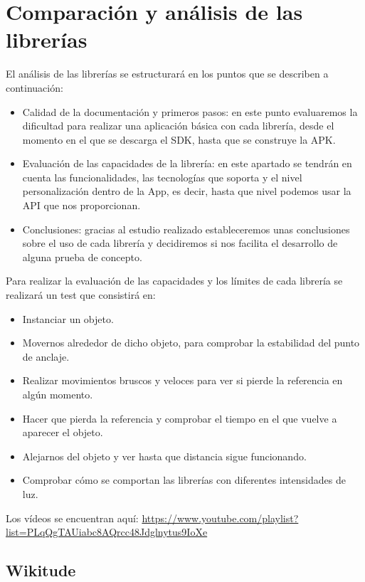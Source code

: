 
\chapter{Comparación y análisis de las librerías}

El análisis de las librerías se estructurará en los puntos que se describen a continuación:
\begin{itemize}
\item Calidad de la documentación y primeros pasos: en este punto evaluaremos la dificultad para realizar una aplicación básica con cada librería, desde el momento en el que se descarga el SDK, hasta que se construye la APK. 
\item Evaluación de las capacidades de la librería: en este apartado se tendrán en cuenta las funcionalidades, las tecnologías que soporta y el nivel personalización dentro de la App, es decir, hasta que nivel podemos usar la API que nos proporcionan.
\item Conclusiones: gracias al estudio realizado estableceremos unas conclusiones sobre el uso de cada librería y decidiremos si nos facilita el desarrollo de alguna prueba de concepto.
\end{itemize}


Para realizar la evaluación de las capacidades y los límites de cada librería se realizará un test que consistirá en:
\begin{itemize}
\item Instanciar un objeto.
\item Movernos alrededor de dicho objeto, para comprobar la estabilidad del punto de anclaje.
\item Realizar movimientos bruscos y veloces para ver si pierde la referencia en algún momento.
\item Hacer que pierda la referencia y comprobar el tiempo en el que vuelve a aparecer el objeto.
\item Alejarnos del objeto y ver hasta que distancia sigue funcionando.
\item Comprobar cómo se comportan las librerías con diferentes intensidades de luz.
\end{itemize}
Los vídeos se encuentran aquí: \url{ https://www.youtube.com/playlist?list=PLqQgTAUiabc8AQrcc48Jdglnytus9IoXe}
\clearpage
\section{Wikitude}

